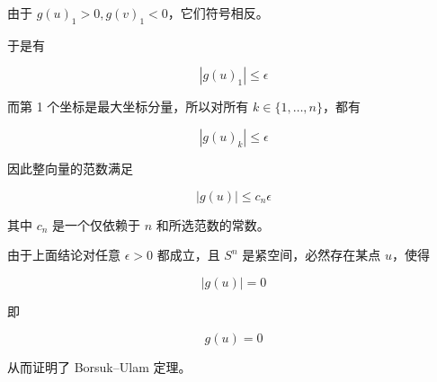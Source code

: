 由于 $g(u)_1 > 0, g(v)_1 < 0$，它们符号相反。

于是有

$$
|g(u)_1| \leq \epsilon
$$

而第 1 个坐标是最大坐标分量，所以对所有 $k \in \{1, \dots, n\}$，都有

$$
|g(u)_k| \leq \epsilon
$$

因此整向量的范数满足

$$
|g(u)| \leq c_n \epsilon
$$

其中 $c_n$ 是一个仅依赖于 $n$ 和所选范数的常数。

由于上面结论对任意 $\epsilon > 0$ 都成立，且 $S^n$ 是紧空间，必然存在某点 $u$，使得

$$
|g(u)| = 0
$$

即

$$
g(u) = 0
$$

从而证明了 Borsuk–Ulam 定理。
